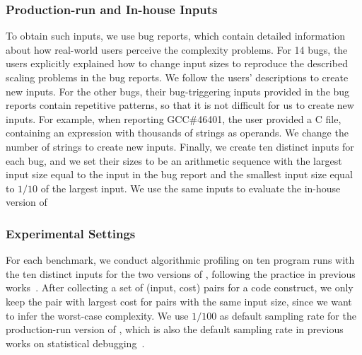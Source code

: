 \subsubsection{Production-run and In-house Inputs}

To obtain such inputs, we use bug reports, 
which contain detailed information about how real-world 
users perceive the complexity problems. 
For 14 bugs, 
the users explicitly explained how to change input sizes 
to reproduce the described scaling problems in the bug reports. 
We follow the users' descriptions to create new inputs. 
For the other bugs, their bug-triggering inputs provided 
in the bug reports contain repetitive patterns, 
so that it is not difficult for us to create new inputs.
For example, when reporting GCC\#46401,
the user provided a C file, 
containing an expression with thousands of strings as operands. 
We change the number of strings to create new inputs. 
Finally, we create ten distinct inputs for each bug, 
and we set their sizes 
to be an arithmetic sequence with the largest input size
equal to the input in the bug report and the 
smallest input size equal to $1/10$ 
of the largest input.
We use the same inputs to evaluate the in-house version of \Tool
{}


\subsubsection{Experimental Settings}

For each benchmark, we conduct algorithmic profiling on ten 
program runs with the ten distinct inputs for the two
versions of \Tool, following the practice in 
previous works~\cite{joy.asplos13,SongOOPSLA2014}.
After collecting a set of (input, cost) pairs for a code construct,
we only keep the pair with largest cost for pairs with the same input size,
since we want to infer the worst-case complexity.
We use $1/100$ as default sampling rate for 
the production-run version of \Tool, 
which is also the default sampling rate 
in previous works on statistical debugging~\cite{liblit03,CCI,ldoctor}.



